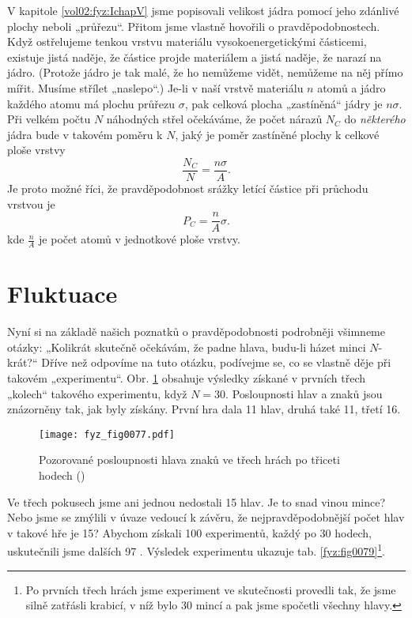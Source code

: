     V kapitole \ref{vol02:fyz:IchapV} jsme popisovali velikost jádra pomocí jeho zdánlivé plochy
    neboli „průřezu“. Přitom jsme vlastně hovořili o pravděpodobnostech. Když ostřelujeme tenkou
    vrstvu materiálu vysokoenergetickými částicemi, existuje jistá naděje, že částice projde
    materiálem a jistá naděje, že narazí na jádro. (Protože jádro je tak malé, že ho nemůžeme vidět,
    nemůžeme na něj přímo mířit. Musíme střílet „naslepo“.) Je-li v naší vrstvě materiálu \(n\)
    atomů a jádro každého atomu má plochu průřezu \(\sigma\), pak celková plocha „zastíněná“ jádry
    je \(n\sigma\). Při velkém počtu \(N\) náhodných střel očekáváme, že počet nárazů \(N_C\) do
    \emph{některého} jádra bude v takovém poměru k \(N\), jaký je poměr zastíněné plochy k celkové
    ploše vrstvy
    \begin{equation}\label{fyz:eq072}
      \frac{N_C}{N} = \frac{n\sigma}{A}.
    \end{equation}
    Je proto možné říci, že pravděpodobnost srážky letící částice při průchodu vrstvou je
    \begin{equation}\label{fyz:eq073}
      P_C = \frac{n}{A}\sigma.
    \end{equation}
    kde \(\frac{n}{A}\) je počet atomů v jednotkové ploše vrstvy.
    
  \section{Fluktuace}
    Nyní si na základě našich poznatků o pravděpodobnosti podrobněji všimneme otázky: „Kolikrát 
    skutečně očekávám, že padne hlava, budu-li házet minci \(N\)- krát?“ Dříve než odpovíme na tuto 
    otázku, podívejme se, co se vlastně děje při takovém „experimentu“. Obr. \ref{fyz:fig0077} 
    obsahuje výsledky získané v prvních třech „kolech“ takového experimentu, když \(N= 30\). 
    Posloupnosti hlav a znaků jsou znázorněny tak, jak byly získány. První hra dala \num{11} hlav, 
    druhá také \num{11}, třetí \num{16}.
    
    \begin{figure}[ht!]  %
      \centering
      \texttt{[image: fyz\_fig0077.pdf]}
      \caption{Pozorované posloupnosti hlava znaků ve třech hrách po třiceti hodech 
              (\cite[s.~79]{Feynman01})}
      \label{fyz:fig0077}
    \end{figure}
    Ve třech pokusech jsme ani jednou nedostali \num{15} hlav. Je to snad vinou mince? Nebo jsme se 
    zmýlili v úvaze vedoucí k závěru, že nejpravděpodobnější počet hlav v takové hře je \num{15}? 
    Abychom získali \num{100} experimentů, každý po \num{30} hodech, uskutečnili jsme dalších 
    \num{97} . Výsledek experimentu ukazuje tab. \ref{fyz:fig0079}\footnote{Po prvních třech 
    hrách jsme experiment ve skutečnosti provedli tak, že jsme silně zatřásli krabicí, v níž bylo 
    \num{30} mincí a pak jsme spočetli všechny hlavy.}.
    
